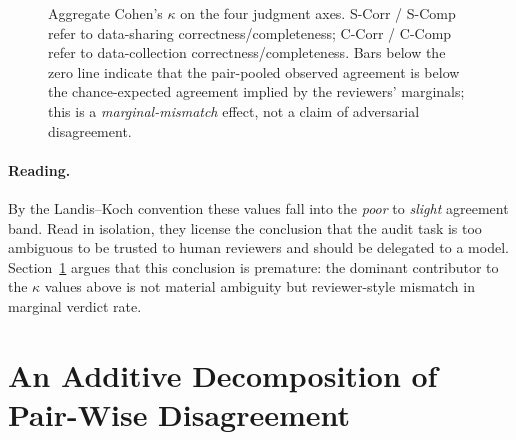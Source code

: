 \documentclass[11pt,a4paper]{article}
\begin{document}
\begin{figure}[!htbp]
\centering
{}
\caption{Aggregate Cohen's $\kappa$ on the four judgment axes.
S-Corr / S-Comp refer to data-sharing correctness/completeness;
C-Corr / C-Comp refer to data-collection correctness/completeness.
Bars below the zero line indicate that the pair-pooled observed
agreement is below the chance-expected agreement implied by the
reviewers' marginals; this is a \emph{marginal-mismatch} effect, not
a claim of adversarial disagreement.}
\label{fig:kappa-agg}
\end{figure}

\paragraph{Reading.}
By the Landis--Koch convention these values fall into the
\emph{poor} to \emph{slight} agreement band. Read in isolation, they
license the conclusion that the audit task is too ambiguous to be
trusted to human reviewers and should be delegated to a model.
Section~\ref{sec:reviewer-aware-kappa} argues that this conclusion
is premature: the dominant contributor to the $\kappa$ values above
is not material ambiguity but reviewer-style mismatch in marginal
verdict rate.

\section{An Additive Decomposition of Pair-Wise Disagreement}
\label{sec:reviewer-aware-kappa}
\end{document}
